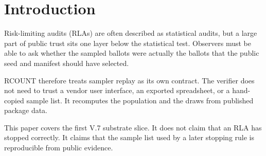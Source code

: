 \section{Introduction}

Risk-limiting audits (RLAs) are often described as statistical audits, but a
large part of public trust sits one layer below the statistical test. Observers
must be able to ask whether the sampled ballots were actually the ballots that
the public seed and manifest should have selected.

RCOUNT therefore treats sampler replay as its own contract. The verifier does
not need to trust a vendor user interface, an exported spreadsheet, or a
hand-copied sample list. It recomputes the population and the draws from
published package data.

This paper covers the first V.7 substrate slice. It does not claim that an RLA
has stopped correctly. It claims that the sample list used by a later stopping
rule is reproducible from public evidence.
